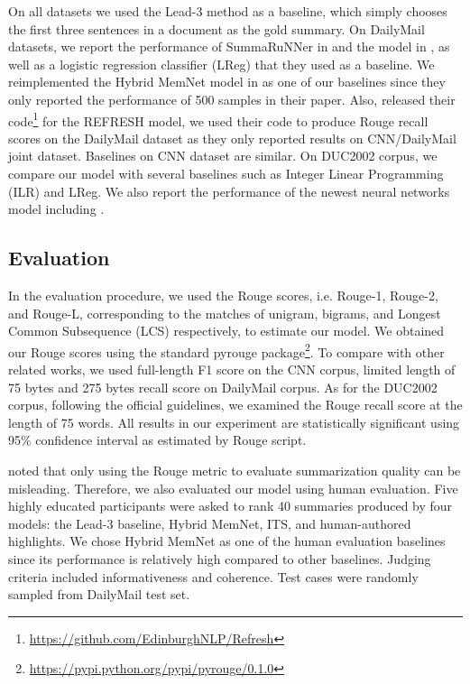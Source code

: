 \documentclass[11pt,a4paper]{article}
\begin{document}
On all datasets we used the Lead-3 method as a baseline, which simply chooses the first three sentences in a document as the gold summary.
On DailyMail datasets, we report the performance of SummaRuNNer in \cite{Nallapati2016SummaRuNNer} and the model in  \cite{Cheng2016Neural}, as well as a logistic regression classifier (LReg) that they used as a baseline.
We reimplemented the Hybrid MemNet model in \cite{Singh2017Hybrid} as one of our baselines since they only reported the performance of 500 samples in their paper.
Also, \citet{Narayan2018Ranking} released their code\footnote{\url{https://github.com/EdinburghNLP/Refresh}} for the REFRESH model, we used their code to produce Rouge recall scores on the DailyMail dataset as they only reported results on CNN/DailyMail joint dataset.
Baselines on CNN dataset are similar. 
On DUC2002 corpus, we compare our model with several baselines such as Integer Linear Programming (ILR) and LReg. 
We also report the performance of the newest neural networks model including \cite{Nallapati2016SummaRuNNer,Cheng2016Neural,Singh2017Hybrid}.

\subsection{Evaluation}
In the evaluation procedure, we used the Rouge scores, i.e. Rouge-1, Rouge-2, and Rouge-L, corresponding to the matches of unigram, bigrams, and Longest Common Subsequence (LCS) respectively, to estimate our model.
We obtained our Rouge scores using the standard pyrouge package\footnote{\url{https://pypi.python.org/pypi/pyrouge/0.1.0}}.
To compare with other related works, we used full-length F1 score on the CNN corpus, limited length of 75 bytes and 275 bytes recall score on DailyMail corpus. 
As for the DUC2002 corpus, following the official guidelines, we examined the Rouge recall score at the length of 75 words. 
All results in our experiment are statistically significant using 95\% confidence interval as estimated by Rouge script.

\citet{schluter2017limits} noted that only using the Rouge metric to evaluate summarization quality can be misleading. Therefore, we also evaluated our model using human evaluation. 
Five highly educated participants were asked to rank 40 summaries produced by four models: the Lead-3 baseline, Hybrid MemNet, ITS, and human-authored highlights. 
We chose Hybrid MemNet as one of the human evaluation baselines since its performance is relatively high compared to other baselines.
Judging criteria included informativeness and coherence. Test cases were randomly sampled from DailyMail test set.
\end{document}
